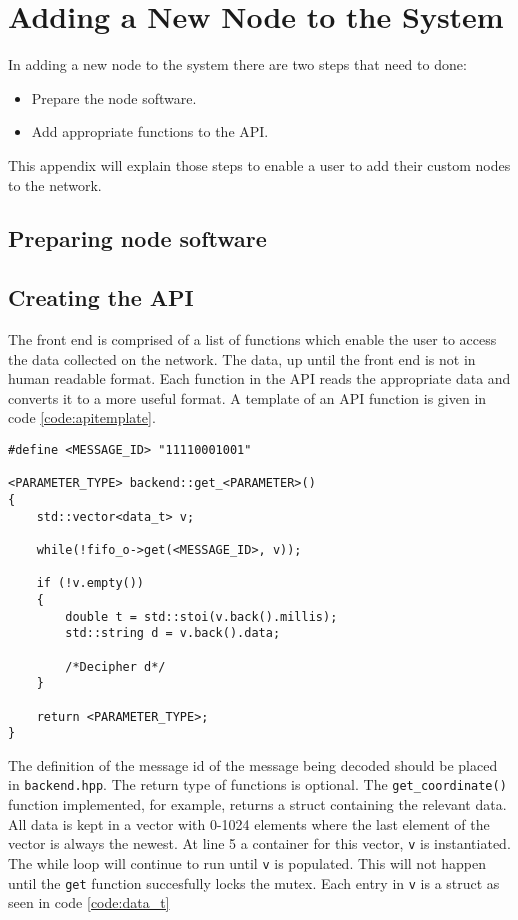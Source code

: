 \section{Adding a New Node to the System}
\label{app:addnode}
In adding a new node to the system there are two steps that need to done:
\begin{itemize}
	\item Prepare the node software.
	\item Add appropriate functions to the API.
\end{itemize}
This appendix will explain those steps to enable a user to add their custom nodes to the network.
\subsection{Preparing node software}\label{sec:node_implementation_guide}

\subsection{Creating the API}
The front end is comprised of a list of functions which enable the user to access the data collected on the network.
The data, up until the front end is not in human readable format.
Each function in the API reads the appropriate data and converts it to a more useful format.
A template of an API function is given in code \ref{code:apitemplate}.

\begin{lstlisting}[caption=Function template for accesing data,label=code:apitemplate]
#define <MESSAGE_ID> "11110001001"

<PARAMETER_TYPE> backend::get_<PARAMETER>()
{
	std::vector<data_t> v;

	while(!fifo_o->get(<MESSAGE_ID>, v));

	if (!v.empty())
	{
		double t = std::stoi(v.back().millis);
		std::string d = v.back().data;

		/*Decipher d*/		
	}

	return <PARAMETER_TYPE>;
}
\end{lstlisting}

The definition of the message id of the message being decoded should be placed in \texttt{backend.hpp}.
The return type of functions is optional.
The \texttt{get\_coordinate()} function implemented, for example, returns a struct containing the relevant data.
All data is kept in a vector with 0-1024 elements where the last element of the vector is always the newest.
At line 5 a container for this vector, \texttt{v} is instantiated.
The while loop will continue to run until \texttt{v} is populated.
This will not happen until the \texttt{get} function succesfully locks the mutex.
Each entry in \texttt{v} is a struct as seen in code \ref{code:data_t}

